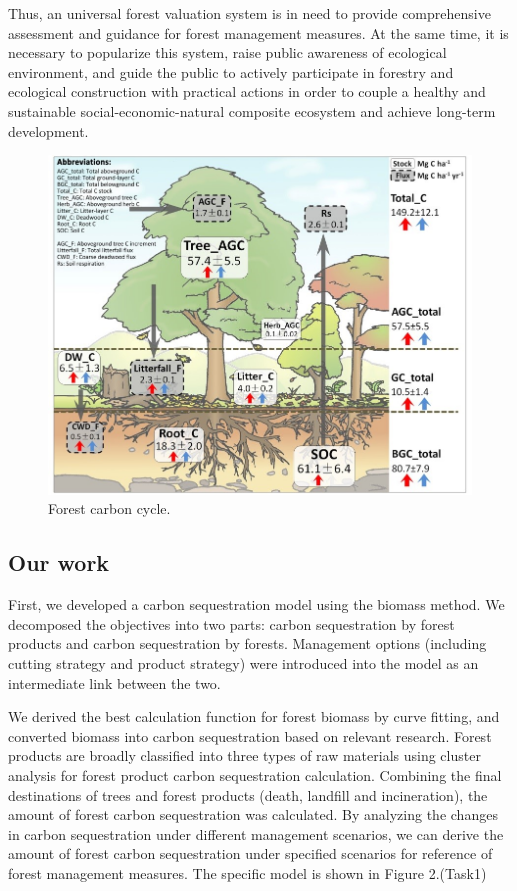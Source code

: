 Thus, an universal forest valuation system is in need to provide comprehensive assessment and guidance for forest management measures. At the same time, it is necessary to popularize this system, raise public awareness of ecological environment, and guide the public to actively participate in forestry and ecological construction with practical actions in order to couple a healthy and sustainable social-economic-natural composite ecosystem and achieve long-term development.
\begin{figure}[htp]
    \centering
    \includegraphics[width=13cm]{figs/carbon_cycle.jpg}
    \caption{Forest carbon cycle.}
    \label{fig:my_label}
\end{figure}

\subsection{Our work}
First, we developed a carbon sequestration model using the biomass method. We decomposed the objectives into two parts: carbon sequestration by forest products and carbon sequestration by forests. Management options (including cutting strategy and product strategy) were introduced into the model as an intermediate link between the two. 

We derived the best calculation function for forest biomass by curve fitting, and converted biomass into carbon sequestration based on relevant research. Forest products are broadly classified into three types of raw materials using cluster analysis for forest product carbon sequestration calculation. Combining the final destinations of trees and forest products (death, landfill and incineration), the amount of forest carbon sequestration was calculated. By analyzing the changes in carbon sequestration under different management scenarios, we can derive the amount of forest carbon sequestration under specified scenarios for reference of forest management measures.
The specific model is shown in Figure 2.(Task1)

